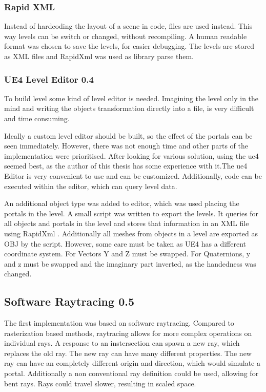\subsubsection{Rapid XML}
Instead of hardcoding the layout of a scene in code, files are used instead. This way levels can be switch or changed, without recompiling. A human readable format was chosen to save the levels, for easier debugging. The levels are stored as XML files and RapidXml \cite{rapidxml} was used as library parse them.

\subsubsection{UE4 Level Editor 0.4}
To build level some kind of level editor is needed. Imagining the level only in the mind and writing the objects transformation directly into a file, is very difficult and time consuming.

Ideally a custom level editor should be built, so the effect of the portals can be seen immediately. However, there was not enough time and other parts of the implementation were prioritised. After looking for various solution, using the \gls{ue4} \cite{ue4} seemed best, as the author of this thesis has some experience with it.The \gls{ue4} Editor is very convenient to use and can be customized. Additionally, code can be executed within the editor, which can query level data.

An additional object type was added to editor, which was used placing the portals in the level. A small script was written to export the levels. It queries for all objects and portals in the level and stores that information in an XML file using RapidXml \cite{rapidxml}. Additionally all meshes from objects in a level are exported as OBJ by the script. However, some care must be taken as UE4 has a different coordinate system. For Vectors Y and Z must be swapped. For Quaternions, y and z must be swapped and the imaginary part inverted, as the handedness was changed.


\subsection{Software Raytracing 0.5}
The first implementation was based on software raytracing. Compared to rasterization based methods, raytracing allows for more complex operations on individual rays. A response to an instersection can spawn a new ray, which replaces the old ray. The new ray can have many different properties. The new ray can have an completely different origin and direction, which would simulate a portal. Additionally a non conventional ray definition could be used, allowing for bent rays. Rays could travel slower, resulting in scaled space.

